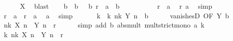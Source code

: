 \begin{isabellebody}
\ \ \ \ \isamarkupfalse%
\ X\ \isamarkupfalse%
\ blast\isanewline
\ \ \isamarkupfalse%
\ b\ \ b{\isacharcolon}{\kern0pt}\ {\isachardoublequoteopen}{}\ {\isacharless}{\kern0pt}\ b{\isachardoublequoteclose}\ {\isachardoublequoteopen}r\ {\isacharequal}{\kern0pt}\ a\ {\isacharasterisk}{\kern0pt}\ b{\isachardoublequoteclose}\isanewline
\ \ \isamarkupfalse%
\isanewline
\ \ \ \ \isamarkupfalse%
\ {\isachardoublequoteopen}{}\ {\isacharless}{\kern0pt}\ r\ {\isacharslash}{\kern0pt}\ a{\isachardoublequoteclose}\ \isamarkupfalse%
\ r\ a\ \isamarkupfalse%
\ simp\isanewline
\ \ \ \ \isamarkupfalse%
\ {\isachardoublequoteopen}r\ {\isacharequal}{\kern0pt}\ a\ {\isacharasterisk}{\kern0pt}\ {\isacharparenleft}{\kern0pt}r\ {\isacharslash}{\kern0pt}\ a{\isacharparenright}{\kern0pt}{\isachardoublequoteclose}\ \isamarkupfalse%
\ a\ \isamarkupfalse%
\ simp\isanewline
\ \ \isamarkupfalse%
\isanewline
\ \ \isamarkupfalse%
\ k\ \ k{\isacharcolon}{\kern0pt}\ {\isachardoublequoteopen}{\isasymforall}n{\isasymge}k{\isachardot}{\kern0pt}\ {\isasymbar}Y\ n{\isasymbar}\ {\isacharless}{\kern0pt}\ b{\isachardoublequoteclose}\isanewline
\ \ \ \ \isamarkupfalse%
\ vanishesD\ {\isacharbrackleft}{\kern0pt}OF\ Y\ b{\isacharparenleft}{\kern0pt}{}{\isacharparenright}{\kern0pt}{\isacharbrackright}{\kern0pt}\ \isacommand{{\isachardot}{\kern0pt}{\isachardot}{\kern0pt}}\isamarkupfalse%
\isanewline
\ \ \isamarkupfalse%
\ {\isachardoublequoteopen}{\isasymforall}n{\isasymge}k{\isachardot}{\kern0pt}\ {\isasymbar}X\ n\ {\isacharasterisk}{\kern0pt}\ Y\ n{\isasymbar}\ {\isacharless}{\kern0pt}\ r{\isachardoublequoteclose}\isanewline
\ \ \ \ \isamarkupfalse%
\ {\isacharparenleft}{\kern0pt}simp\ add{\isacharcolon}{\kern0pt}\ b{\isacharparenleft}{\kern0pt}{}{\isacharparenright}{\kern0pt}\ abs{\isacharunderscore}{\kern0pt}mult\ mult{\isacharunderscore}{\kern0pt}strict{\isacharunderscore}{\kern0pt}mono{\isacharprime}{\kern0pt}\ a\ k{\isacharparenright}{\kern0pt}\isanewline
\ \ \isamarkupfalse%
\ \isamarkupfalse%
\ {\isachardoublequoteopen}{\isasymexists}k{\isachardot}{\kern0pt}\ {\isasymforall}n{\isasymge}k{\isachardot}{\kern0pt}\ {\isasymbar}X\ n\ {\isacharasterisk}{\kern0pt}\ Y\ n{\isasymbar}\ {\isacharless}{\kern0pt}\ r{\isachardoublequoteclose}\ \isacommand{{\isachardot}{\kern0pt}{\isachardot}{\kern0pt}}\isamarkupfalse%

\end{isabellebody}
